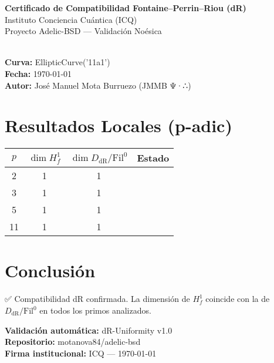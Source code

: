 \documentclass[12pt]{article}
\newcommand{\OK}{\textcolor{green}{\checkmark}}
\begin{document}
\begin{center}
{\LARGE \textbf{Certificado de Compatibilidad Fontaine–Perrin–Riou (dR)}}\\[4mm]
{\large Instituto Conciencia Cuántica (ICQ)}\\[2mm]
{\large Proyecto Adelic-BSD — Validación Noésica}\\[1cm]
\hrulefill\\[0.6cm]
\end{center}

\noindent
\textbf{Curva:} EllipticCurve('11a1')\\
\textbf{Fecha:} \today\\
\textbf{Autor:} José Manuel Mota Burruezo (JMMB Ψ·∴)\\[0.4cm]

\section*{Resultados Locales (p-adic)}
\begin{tabular}{cccc}
\toprule
$p$ & $\dim H^1_f$ & $\dim D_{\mathrm{dR}}/\mathrm{Fil}^0$ & Estado \\
\midrule
2 & 1 & 1 & \OK\\
3 & 1 & 1 & \OK\\
5 & 1 & 1 & \OK\\
11 & 1 & 1 & \OK\\
\bottomrule
\end{tabular}

\vspace{0.5cm}
\section*{Conclusión}
\noindent
✅ Compatibilidad dR confirmada. La dimensión de $H^1_f$ coincide con la de $D_{\mathrm{dR}}/\mathrm{Fil}^0$ en todos los primos analizados.

\vspace{1cm}
\begin{flushright}
\textbf{Validación automática:} dR-Uniformity v1.0\\
\textbf{Repositorio:} motanova84/adelic-bsd\\
\textbf{Firma institucional:} ICQ — \today
\end{flushright}
\end{document}
